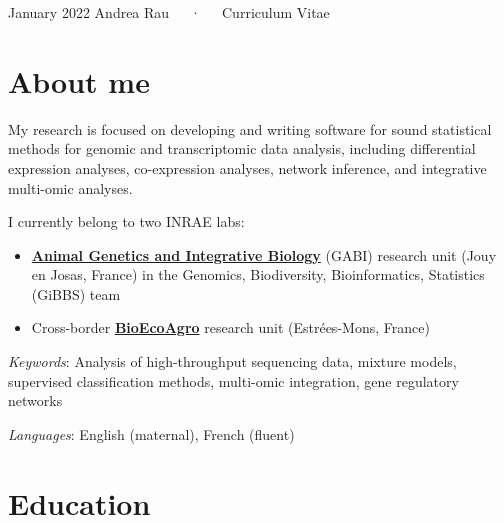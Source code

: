 \documentclass[11pt, a4paper]{awesome-cv}
\providecommand{\tightlist}{%
	\setlength{\itemsep}{0pt}\setlength{\parskip}{0pt}}
\begin{document}
\makecvheader

\makecvfooter
  {January 2022}
    {Andrea Rau~~~·~~~Curriculum Vitae}
  {\thepage}





\hypertarget{about-me}{%
\section{About me}\label{about-me}}

My research is focused on developing and writing software for sound
statistical methods for genomic and transcriptomic data analysis,
including differential expression analyses, co-expression analyses,
network inference, and integrative multi-omic analyses.

I currently belong to two INRAE labs:

\begin{itemize}
\tightlist
\item
  \href{https://www6.jouy.inra.fr/gabi_eng/}{\textbf{Animal Genetics and
  Integrative Biology}} (GABI) research unit (Jouy en Josas, France) in
  the Genomics, Biodiversity, Bioinformatics, Statistics (GiBBS) team\\
\item
  Cross-border \href{https://www.bioecoagro.eu/}{\textbf{BioEcoAgro}}
  research unit (Estrées-Mons, France)
\end{itemize}

\emph{Keywords}: Analysis of high-throughput sequencing data, mixture
models, supervised classification methods, multi-omic integration, gene
regulatory networks

\emph{Languages}: English (maternal), French (fluent)

\hypertarget{education}{%
\section{Education}\label{education}}
\end{document}
